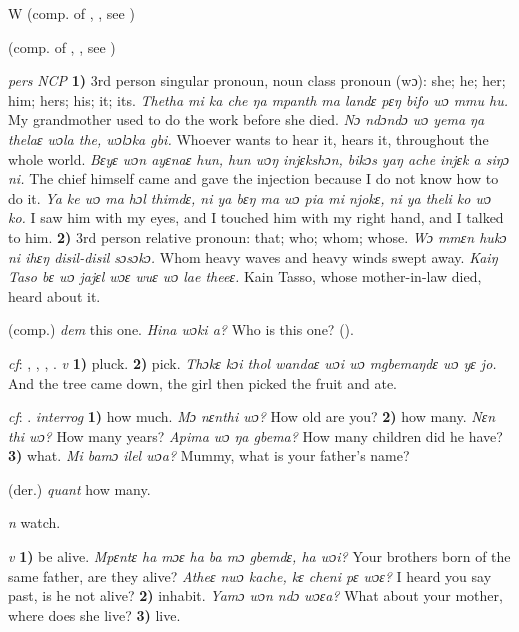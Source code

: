 \begin{letter}{W}
 (comp. of , , see ) 

 (comp. of , , see ) 

 \textit{pers} \textit{NCP} \textbf{1)} 3rd person singular pronoun, noun class pronoun (wɔ): she; he; her; him; hers; his; it; its. \textit{Thetha mi ka che ŋa mpanth ma landɛ pɛŋ bifo wɔ mmu hu.} My grandmother used to do the work before she died. \textit{Nɔ ndɔndɔ wɔ yema ŋa thelaɛ wɔla the, wɔlɔka gbi.} Whoever wants to hear it, hears it, throughout the whole world. \textit{Bɛyɛ wɔn ayɛnaɛ hun, hun wɔŋ injɛkshɔn, bikɔs yaŋ ache injɛk a siŋɔ ni.} The chief himself came and gave the injection because I do not know how to do it. \textit{Ya ke wɔ ma hɔl thimdɛ, ni ya bɛŋ ma wɔ pia mi njokɛ, ni ya theli ko wɔ ko.} I saw him with my eyes, and I touched him with my right hand, and I talked to him. \textbf{2)} 3rd person relative pronoun: that; who; whom; whose. \textit{Wɔ mmɛn hukɔ ni ihɛŋ disil-disil sɔsɔkɔ.} Whom heavy waves and heavy winds swept away. \textit{Kaiŋ Taso bɛ wɔ jajɛl wɔɛ wuɛ wɔ lae theeɛ.} Kain Tasso, whose mother-in-law died, heard about it.

 (comp.) \textit{dem} this one. \textit{Hina wɔki a?} Who is this one? (\citealt{Pichl1967}).

 \textit{cf}: , , , . \textit{v} \textbf{1)} pluck. \textbf{2)} pick. \textit{Thɔkɛ kɔi thol wandaɛ wɔi wɔ mgbemaŋdɛ wɔ yɛ jo.} And the tree came down, the girl then picked the fruit and ate.

 \textit{cf}: . \textit{interrog} \textbf{1)} how much. \textit{Mɔ nɛnthi wɔ?} How old are you? \textbf{2)} how many. \textit{Nɛn thi wɔ?} How many years? \textit{Apima wɔ ŋa gbema?} How many children did he have? \textbf{3)} what. \textit{Mi bamɔ ilel wɔa?} Mummy, what is your father's name?

 (der.) \textit{quant} how many. 

 \textit{n} watch.

 \textit{v} \textbf{1)} be alive. \textit{Mpɛntɛ ha mɔɛ ha ba mɔ gbemdɛ, ha wɔi?} Your brothers born of the same father, are they alive? \textit{Atheɛ nwɔ kache, kɛ cheni pɛ wɔɛ?} I heard you say past, is he not alive? \textbf{2)} inhabit. \textit{Yamɔ wɔn ndɔ wɔɛa?} What about your mother, where does she live? \textbf{3)} live.


\end{letter}
